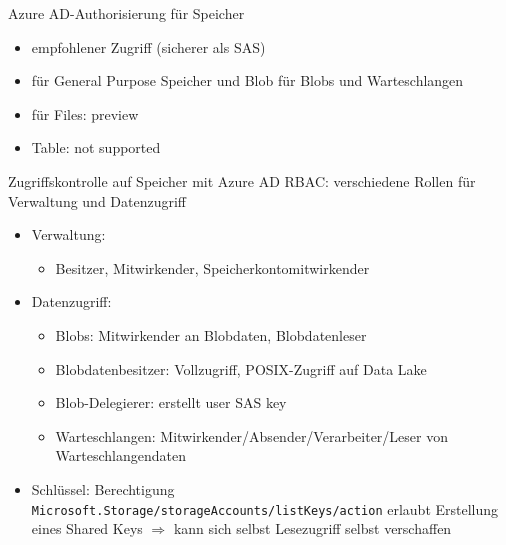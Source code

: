 
\begin{flashcard}[Definition]{Azure AD-Authorisierung für Speicher}
    \begin{itemize}
        \item empfohlener Zugriff (sicherer als SAS)
        \item für General Purpose Speicher und Blob für Blobs und Warteschlangen
        \item für Files: preview
        \item Table: not supported
    \end{itemize}
\end{flashcard}

\begin{flashcard}[Definition]{Zugriffskontrolle auf Speicher mit Azure AD}
    RBAC: verschiedene Rollen für Verwaltung und Datenzugriff
    \begin{itemize}
        \item Verwaltung:
            \begin{itemize}
                \item Besitzer, Mitwirkender, Speicherkontomitwirkender
            \end{itemize}
        \item Datenzugriff:
            \begin{itemize}
                \item Blobs: Mitwirkender an Blobdaten, Blobdatenleser
                \item Blobdatenbesitzer: Vollzugriff, POSIX-Zugriff auf Data Lake
                \item Blob-Delegierer: erstellt user SAS key
                \item Warteschlangen: Mitwirkender/Absender/Verarbeiter/Leser von Warteschlangendaten
            \end{itemize}
        \item Schlüssel:\newline
            Berechtigung \texttt{Microsoft.Storage/storageAccounts/listKeys/action} erlaubt Erstellung eines Shared Keys $\Rightarrow$ kann sich selbst Lesezugriff selbst verschaffen
    \end{itemize}
\end{flashcard}

